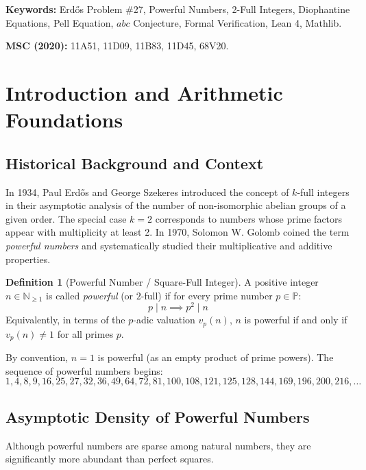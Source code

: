 \documentclass[11pt,a4paper]{article}
\theoremstyle{definition}
\newtheorem{definition}[theorem]{Definition}
\begin{document}
\vspace{0.5em}
\noindent\textbf{Keywords:} Erd\H{o}s Problem \#27, Powerful Numbers, 2-Full Integers, Diophantine Equations, Pell Equation, $abc$ Conjecture, Formal Verification, Lean 4, Mathlib.

\noindent\textbf{MSC (2020):} 11A51, 11D09, 11B83, 11D45, 68V20.

\tableofcontents
\newpage

\section{Introduction and Arithmetic Foundations}

\subsection{Historical Background and Context}
In 1934, Paul Erd\H{o}s and George Szekeres \cite{erdos1934} introduced the concept of $k$-full integers in their asymptotic analysis of the number of non-isomorphic abelian groups of a given order. The special case $k=2$ corresponds to numbers whose prime factors appear with multiplicity at least 2. In 1970, Solomon W. Golomb \cite{golomb1970} coined the term \emph{powerful numbers} and systematically studied their multiplicative and additive properties.

\begin{definition}[Powerful Number / Square-Full Integer]\label{def:powerful}
A positive integer $n \in \mathbb{N}_{\ge 1}$ is called \emph{powerful} (or $2$-full) if for every prime number $p \in \mathbb{P}$:
\begin{equation}\label{eq:def_powerful}
p \mid n \implies p^2 \mid n
\end{equation}
Equivalently, in terms of the $p$-adic valuation $v_p(n)$, $n$ is powerful if and only if $v_p(n) \ne 1$ for all primes $p$.
\end{definition}

By convention, $n = 1$ is powerful (as an empty product of prime powers). The sequence of powerful numbers begins:
\[ 1, 4, 8, 9, 16, 25, 27, 32, 36, 49, 64, 72, 81, 100, 108, 121, 125, 128, 144, 169, 196, 200, 216, \dots \]

\subsection{Asymptotic Density of Powerful Numbers}
Although powerful numbers are sparse among natural numbers, they are significantly more abundant than perfect squares. 
\end{document}
